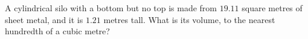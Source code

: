 A cylindrical silo with a bottom but no top is made from $19.11$ square metres of sheet metal, and it is $1.21$ metres tall. What is its volume, to the nearest hundredth of a cubic metre?
